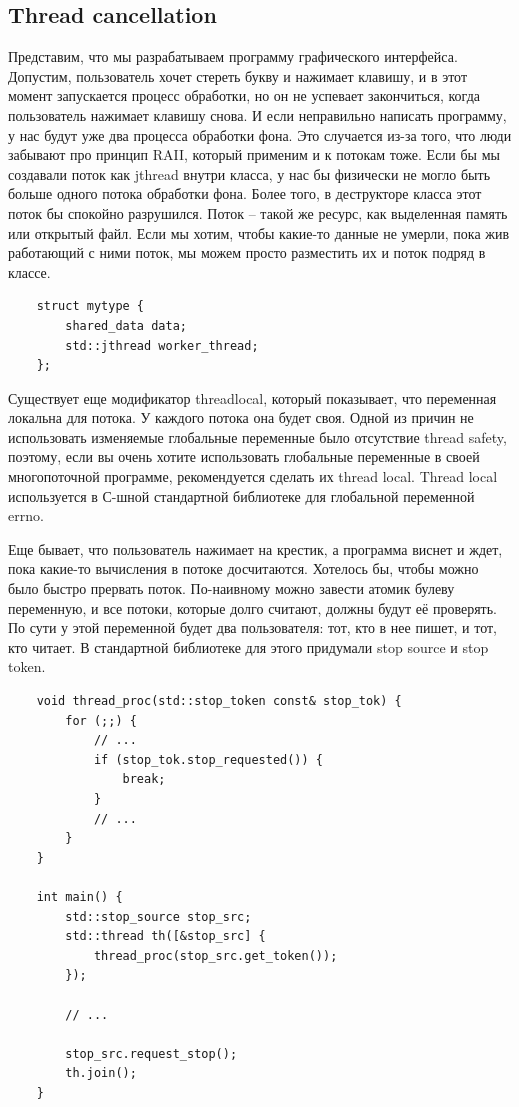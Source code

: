 \documentclass[12pt, a4paper]{article}
\begin{document}
\subsection{Thread cancellation}
Представим, что мы разрабатываем программу графического интерфейса. Допустим, пользователь хочет стереть букву и нажимает клавишу, и в этот момент запускается процесс обработки, но он не успевает закончиться, когда пользователь нажимает клавишу снова. И если неправильно написать программу, у нас будут уже два процесса обработки фона. Это случается из-за того, что люди забывают про принцип RAII, который применим и к потокам тоже. Если бы мы создавали поток как jthread внутри класса, у нас бы физически не могло быть больше одного потока обработки фона. Более того, в деструкторе класса этот поток бы спокойно разрушился. Поток -- такой же ресурс, как выделенная память или открытый файл. Если мы хотим, чтобы какие-то данные не умерли, пока жив работающий с ними поток, мы можем просто разместить их и поток подряд в классе.
\begin{verbatim}
	struct mytype {
		shared_data data;
		std::jthread worker_thread;
	};
\end{verbatim}
Существует еще модификатор thread\textunderscore local, который показывает, что переменная локальна для потока. У каждого потока она будет своя. Одной из причин не использовать изменяемые глобальные переменные было отсутствие thread safety, поэтому, если вы очень хотите использовать глобальные переменные в своей многопоточной программе, рекомендуется сделать их thread local. Thread local используется в С-шной стандартной библиотеке для глобальной переменной errno.\\
\par Еще бывает, что пользователь нажимает на крестик, а программа виснет и ждет, пока какие-то вычисления в потоке досчитаются. Хотелось бы, чтобы можно было быстро прервать поток. По-наивному можно завести атомик булеву переменную, и все потоки, которые долго считают, должны будут её проверять. По сути у этой переменной будет два пользователя: тот, кто в нее пишет, и тот, кто читает. В стандартной библиотеке для этого придумали stop source и stop token.
\begin{verbatim}
	void thread_proc(std::stop_token const& stop_tok) {
		for (;;) {
			// ...
			if (stop_tok.stop_requested()) {
				break;
			}
			// ...
		}
	}
	
	int main() {
		std::stop_source stop_src;
		std::thread th([&stop_src] { 
			thread_proc(stop_src.get_token()); 
		});
		
		// ...
		
		stop_src.request_stop();
		th.join();
	}
\end{verbatim}
\end{document}
